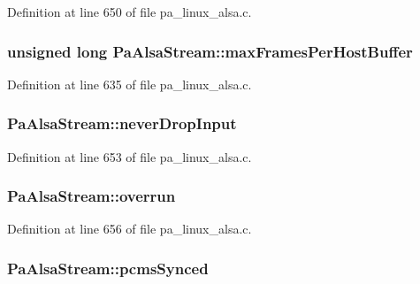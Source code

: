 Definition at line 650 of file pa\+\_\+linux\+\_\+alsa.\+c.

\subsubsection[{\texorpdfstring{max\+Frames\+Per\+Host\+Buffer}{maxFramesPerHostBuffer}}]{\setlength{\rightskip}{0pt plus 5cm}unsigned long Pa\+Alsa\+Stream\+::max\+Frames\+Per\+Host\+Buffer}\hypertarget{struct_pa_alsa_stream_a975c6b88b478a9408d81e84de435369f}{}\label{struct_pa_alsa_stream_a975c6b88b478a9408d81e84de435369f}


Definition at line 635 of file pa\+\_\+linux\+\_\+alsa.\+c.

\subsubsection[{\texorpdfstring{never\+Drop\+Input}{neverDropInput}}]{ Pa\+Alsa\+Stream\+::never\+Drop\+Input}\hypertarget{struct_pa_alsa_stream_ac0213bb3155e96b4445af2ccbc6c6641}{}\label{struct_pa_alsa_stream_ac0213bb3155e96b4445af2ccbc6c6641}


Definition at line 653 of file pa\+\_\+linux\+\_\+alsa.\+c.

\subsubsection[{\texorpdfstring{overrun}{overrun}}]{ Pa\+Alsa\+Stream\+::overrun}\hypertarget{struct_pa_alsa_stream_a3a8accd426fdfb836f6e692648ced93e}{}\label{struct_pa_alsa_stream_a3a8accd426fdfb836f6e692648ced93e}


Definition at line 656 of file pa\+\_\+linux\+\_\+alsa.\+c.

\subsubsection[{\texorpdfstring{pcms\+Synced}{pcmsSynced}}]{ Pa\+Alsa\+Stream\+::pcms\+Synced}\hypertarget{struct_pa_alsa_stream_a07464a14e43b11c9e5de064ed33fae70}{}\label{struct_pa_alsa_stream_a07464a14e43b11c9e5de064ed33fae70}


